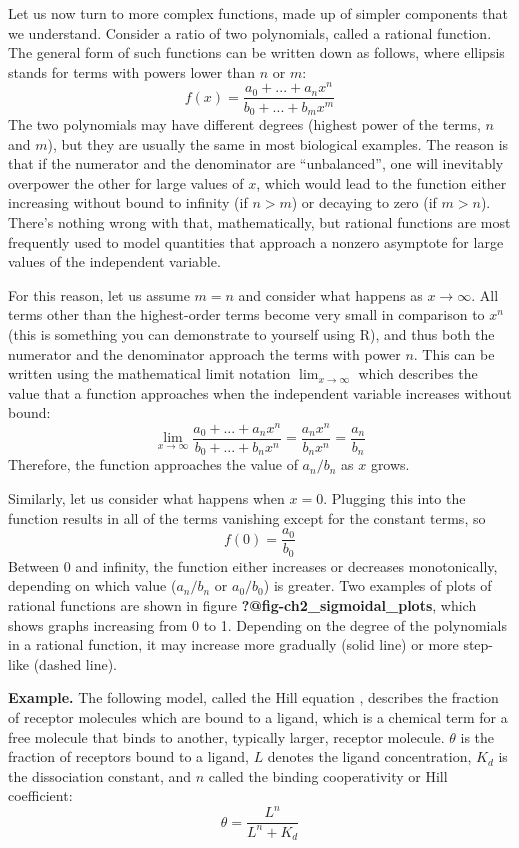 \documentclass[
  letterpaper,
  DIV=11,
  numbers=noendperiod]{scrreprt}
\begin{document}
Let us now turn to more complex functions, made up of simpler components
that we understand. Consider a ratio of two polynomials, called a
 rational function. The general form of such
functions can be written down as follows, where ellipsis stands for
terms with powers lower than \(n\) or \(m\): \begin{equation}
 f(x) = \frac{a_0 + ... + a_n x^n}{b_0 + ... + b_m x^m}
\label{eq:rational_funk}
\end{equation} The two polynomials may have different degrees (highest
power of the terms, \(n\) and \(m\)), but they are usually the same in
most biological examples. The reason is that if the numerator and the
denominator are ``unbalanced'', one will inevitably overpower the other
for large values of \(x\), which would lead to the function either
increasing without bound to infinity (if \(n>m\)) or decaying to zero
(if \(m>n\)). There's nothing wrong with that, mathematically, but
rational functions are most frequently used to model quantities that
approach a nonzero asymptote for large values of the independent
variable.

For this reason, let us assume \(m=n\) and consider what happens as
\(x \to \infty\). All terms other than the highest-order terms become
very small in comparison to \(x^n\) (this is something you can
demonstrate to yourself using R), and thus both the numerator and the
denominator approach the terms with power \(n\). This can be written
using the mathematical limit notation \(\lim_{x \to \infty}\) which
describes the value that a function approaches when the independent
variable increases without bound:
\[  \lim_{x \to \infty} \frac{a_0 + ... + a_n x^n}{b_0 + ... + b_n x^n} = \frac{ a_n x^n}{ b_n x^n}  =  \frac{ a_n}{ b_n}  \]
Therefore, the function approaches the value of \(a_n /b_n\) as \(x\)
grows.

Similarly, let us consider what happens when \(x=0\). Plugging this into
the function results in all of the terms vanishing except for the
constant terms, so \[ f(0) =  \frac{ a_0}{ b_0} \] Between 0 and
infinity, the function either increases or decreases monotonically,
depending on which value (\(a_n /b_n\) or \(a_0/b_0\)) is greater. Two
examples of plots of rational functions are shown in figure
\textbf{?@fig-ch2\_sigmoidal\_plots}, which shows graphs increasing from
0 to 1. Depending on the degree of the polynomials in a rational
function, it may increase more gradually (solid line) or more step-like
(dashed line).

\textbf{Example.} The following model, called the Hill equation
, describes the fraction of
receptor molecules which are bound to a ligand, which is a chemical term
for a free molecule that binds to another, typically larger, receptor
molecule. \(\theta\) is the fraction of receptors bound to a ligand,
\(L\) denotes the ligand concentration, \(K_d\) is the dissociation
constant, and \(n\) called the binding cooperativity
 or Hill coefficient:
\[ \theta = \frac{L^n}{ L^n +K_d}\]
\end{document}
